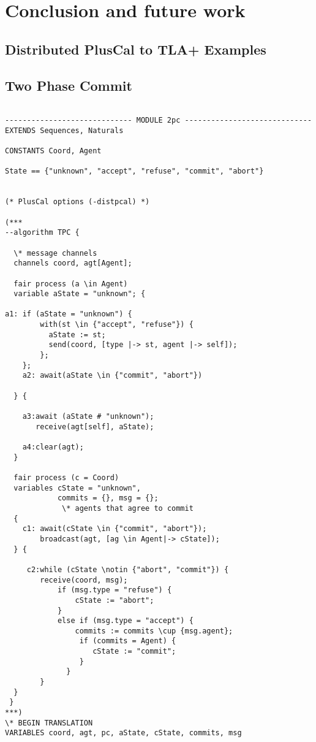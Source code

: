 \documentclass{thesul}
\begin{document}
\chapter{Conclusion and future work}

\begin{appendices}
\chapter{Distributed PlusCal to TLA+ Examples}
\section{Two Phase Commit}
\label{appendix:examples}

\begin{lstlisting}[caption = TLA+ translation for Sub-Processes, frame = tlrb, firstnumber = 1]

----------------------------- MODULE 2pc -----------------------------
EXTENDS Sequences, Naturals

CONSTANTS Coord, Agent

State == {"unknown", "accept", "refuse", "commit", "abort"}

    
(* PlusCal options (-distpcal) *)

(***
--algorithm TPC {
 
  \* message channels
  channels coord, agt[Agent];
     
  fair process (a \in Agent)
  variable aState = "unknown"; {

a1: if (aState = "unknown") {
        with(st \in {"accept", "refuse"}) {
          aState := st;
          send(coord, [type |-> st, agent |-> self]);
        };
    };
    a2: await(aState \in {"commit", "abort"})
    
  } {
    
    a3:await (aState # "unknown");
       receive(agt[self], aState); 
       
    a4:clear(agt);
  }

  fair process (c = Coord) 
  variables cState = "unknown",
            commits = {}, msg = {};
             \* agents that agree to commit
  {
    c1: await(cState \in {"commit", "abort"});    
        broadcast(agt, [ag \in Agent|-> cState]);
  } {
        
     c2:while (cState \notin {"abort", "commit"}) {
        receive(coord, msg);
            if (msg.type = "refuse") {
                cState := "abort";
            }
            else if (msg.type = "accept") {
                commits := commits \cup {msg.agent};
                 if (commits = Agent) {
                    cState := "commit";
                 }
              }
        }
  }
 }
***)
\* BEGIN TRANSLATION
VARIABLES coord, agt, pc, aState, cState, commits, msg


\end{lstlisting}
\end{appendices}
\end{document}
